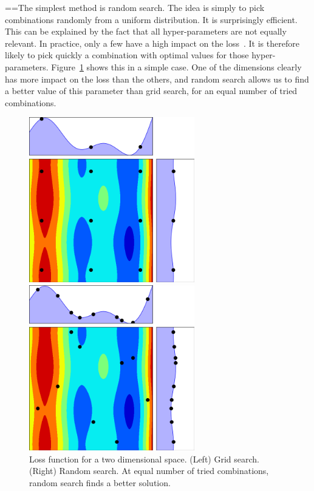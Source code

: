 ==The simplest method is random search. The idea is simply to pick combinations randomly from a uniform distribution. It is surprisingly efficient. This can be explained by the fact that all hyper-parameters are not equally relevant. In practice, only a few have a high impact on the loss~\cite{bergstra2012JMLR}. It is therefore likely to pick quickly a combination with optimal values for those hyper-parameters. Figure~\ref{fig:rs} shows this in a simple case. One of the dimensions clearly has more impact on the loss than the others, and random search allows us to find a better value of this parameter than grid search, for an equal number of tried combinations.

\begin{figure}[htb]
	\begin{minipage}[b]{.49\linewidth}
		\centering
		\centerline{\includegraphics[width=7.2cm]{img_hyperopt/rs_grid}}
	\end{minipage}
	\begin{minipage}[b]{.49\linewidth}
		\centering
		\centerline{\includegraphics[width=7.2cm]{img_hyperopt/rs_random}}
	\end{minipage}
	\caption{Loss function for a two dimensional space. (Left) Grid search. (Right) Random search. At equal number of tried combinations, random search finds a better solution.}
	\label{fig:rs}
\end{figure}

